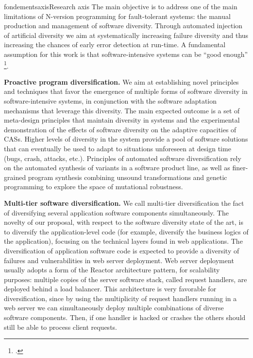 \documentclass{ra2018}
\begin{document}
\begin{module}{fondements}{axis}{Research axis}
The main objective is to address one of the main limitations of N-version programming for fault-tolerant systems: the manual production and management of software diversity. Through automated injection of artificial diversity we aim at systematically increasing failure diversity and thus increasing the chances of early error detection at run-time. A fundamental assumption for this work is that software-intensive systems can be ``good enough''   \footcite{Rinard12, Zhu12}. 

\textbf{Proactive program diversification.} We aim at establishing novel principles and techniques that favor the emergence of multiple forms of software diversity in software-intensive systems, in conjunction with the software adaptation mechanisms that leverage this diversity. The main expected outcome is a set of meta-design principles that maintain diversity in systems and the experimental demonstration of the effects of software diversity on the
adaptive capacities of CASs. Higher levels of diversity in the system provide a pool of software solutions that can eventually be used to adapt to  situations unforeseen at design time (bugs, crash, attacks, etc.). Principles of automated software diversification rely on the automated synthesis of variants in a software product line, as well as finer-grained program synthesis combining unsound transformations and genetic programming to explore the space of mutational robustness.

\textbf{Multi-tier software diversification.} We call  multi-tier diversification the fact of diversifying several application software components simultaneously. The novelty of our proposal, with respect to the software diversity state of the art, is to diversify the application-level code (for example, diversify the business logics of the application), focusing on the technical layers found in web applications. 
The diversification of application software code is expected to provide a diversity of failures and vulnerabilities in web server deployment. 
Web server deployment usually adopts a form of the Reactor architecture pattern, for scalability purposes: multiple copies of the server software stack, called request handlers, are deployed behind a load balancer. 
This architecture is very favorable for diversification, since by using the multiplicity of request handlers running in a web server we can simultaneously deploy multiple combinations of diverse software components. Then, if one handler is hacked or crashes the others should still be able to process client requests.


\end{module}
\end{document}
